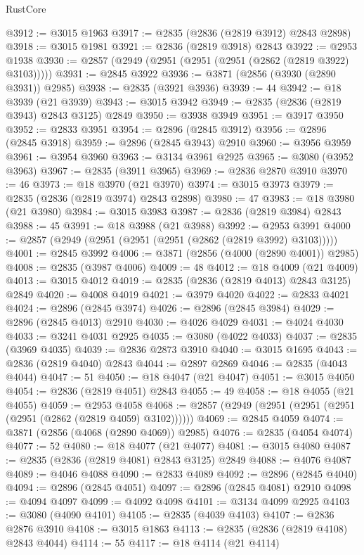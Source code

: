 \begin{lexlean}{RustCore}
\begin{coremodule}
@3912 := @3015 @1963
@3917 := @2835 (@2836 (@2819 @3912) @2843 @2898)
@3918 := @3015 @1981
@3921 := @2836 (@2819 @3918) @2843
@3922 := @2953 @1938
@3930 := @2857 (@2949 (@2951 (@2951 (@2951 (@2862 (@2819 @3922) @3103)))))
@3931 := @2845 @3922
@3936 := @3871 (@2856 (@3930 (@2890 @3931)) @2985)
@3938 := @2835 (@3921 @3936)
@3939 := 44
@3942 := @18 @3939 (@21 @3939)
@3943 := @3015 @3942
@3949 := @2835 (@2836 (@2819 @3943) @2843 @3125) @2849
@3950 := @3938 @3949
@3951 := @3917 @3950
@3952 := @2833 @3951
@3954 := @2896 (@2845 @3912)
@3956 := @2896 (@2845 @3918)
@3959 := @2896 (@2845 @3943) @2910
@3960 := @3956 @3959
@3961 := @3954 @3960
@3963 := @3134 @3961 @2925
@3965 := @3080 (@3952 @3963)
@3967 := @2835 (@3911 @3965)
@3969 := @2836 @2870 @3910
@3970 := 46
@3973 := @18 @3970 (@21 @3970)
@3974 := @3015 @3973
@3979 := @2835 (@2836 (@2819 @3974) @2843 @2898)
@3980 := 47
@3983 := @18 @3980 (@21 @3980)
@3984 := @3015 @3983
@3987 := @2836 (@2819 @3984) @2843
@3988 := 45
@3991 := @18 @3988 (@21 @3988)
@3992 := @2953 @3991
@4000 := @2857 (@2949 (@2951 (@2951 (@2951 (@2862 (@2819 @3992) @3103)))))
@4001 := @2845 @3992
@4006 := @3871 (@2856 (@4000 (@2890 @4001)) @2985)
@4008 := @2835 (@3987 @4006)
@4009 := 48
@4012 := @18 @4009 (@21 @4009)
@4013 := @3015 @4012
@4019 := @2835 (@2836 (@2819 @4013) @2843 @3125) @2849
@4020 := @4008 @4019
@4021 := @3979 @4020
@4022 := @2833 @4021
@4024 := @2896 (@2845 @3974)
@4026 := @2896 (@2845 @3984)
@4029 := @2896 (@2845 @4013) @2910
@4030 := @4026 @4029
@4031 := @4024 @4030
@4033 := @3241 @4031 @2925
@4035 := @3080 (@4022 @4033)
@4037 := @2835 (@3969 @4035)
@4039 := @2836 @2873 @3910
@4040 := @3015 @1695
@4043 := @2836 (@2819 @4040) @2843
@4044 := @2897 @2869
@4046 := @2835 (@4043 @4044)
@4047 := 51
@4050 := @18 @4047 (@21 @4047)
@4051 := @3015 @4050
@4054 := @2836 (@2819 @4051) @2843
@4055 := 49
@4058 := @18 @4055 (@21 @4055)
@4059 := @2953 @4058
@4068 := @2857 (@2949 (@2951 (@2951 (@2951 (@2951 (@2862 (@2819 @4059) @3102))))))
@4069 := @2845 @4059
@4074 := @3871 (@2856 (@4068 (@2890 @4069)) @2985)
@4076 := @2835 (@4054 @4074)
@4077 := 52
@4080 := @18 @4077 (@21 @4077)
@4081 := @3015 @4080
@4087 := @2835 (@2836 (@2819 @4081) @2843 @3125) @2849
@4088 := @4076 @4087
@4089 := @4046 @4088
@4090 := @2833 @4089
@4092 := @2896 (@2845 @4040)
@4094 := @2896 (@2845 @4051)
@4097 := @2896 (@2845 @4081) @2910
@4098 := @4094 @4097
@4099 := @4092 @4098
@4101 := @3134 @4099 @2925
@4103 := @3080 (@4090 @4101)
@4105 := @2835 (@4039 @4103)
@4107 := @2836 @2876 @3910
@4108 := @3015 @1863
@4113 := @2835 (@2836 (@2819 @4108) @2843 @4044)
@4114 := 55
@4117 := @18 @4114 (@21 @4114)

\end{coremodule}
\end{lexlean}
